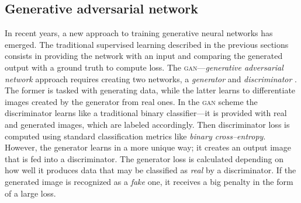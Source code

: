 \subsection{Generative adversarial network}
In recent years, a new approach to training generative neural networks has emerged.
The traditional supervised learning described in the previous sections consists in providing the network with an input and comparing the generated output with a ground truth to compute loss.
The \textsc{gan}---\textit{generative adversarial network} approach requires creating two networks, a \textit{generator} and \textit{discriminator} \cite{goodfellow-2014-gans}.
The former is tasked with generating data, while the latter learns to differentiate images created by the generator from real ones.
In the \textsc{gan} scheme the discriminator learns like a traditional binary classifier---it is provided with real and generated images, which are labeled accordingly.
Then discriminator loss is computed using standard classification metrics like \textit{binary cross--entropy}.
However, the generator learns in a more unique way; it creates an output image that is fed into a discriminator.
The generator loss is calculated depending on how well it produces data that may be classified as \textit{real} by a discriminator.
If the generated image is recognized as a \textit{fake} one, it receives a big penalty in the form of a large loss.

